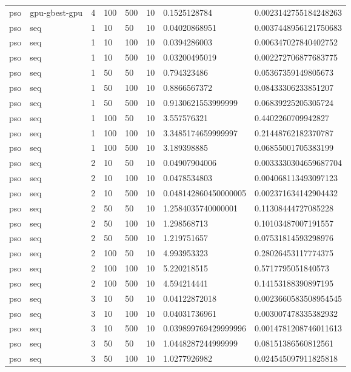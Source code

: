 \begin{table}[t]
\begin{tabular}{llllllll}
pso & gpu-gbest-gpu & 4 & 100 & 500 & 10 & 0.1525128784 & 0.0023142755184248263 \\
pso & seq & 1 & 10 & 50 & 10 & 0.04020868951 & 0.0037448956121750683 \\
pso & seq & 1 & 10 & 100 & 10 & 0.0394286003 & 0.006347027840402752 \\
pso & seq & 1 & 10 & 500 & 10 & 0.03200495019 & 0.002272706877683775 \\
pso & seq & 1 & 50 & 50 & 10 & 0.794323486 & 0.05367359149805673 \\
pso & seq & 1 & 50 & 100 & 10 & 0.8866567372 & 0.08433306233851207 \\
pso & seq & 1 & 50 & 500 & 10 & 0.9130621553999999 & 0.06839225205305724 \\
pso & seq & 1 & 100 & 50 & 10 & 3.557576321 & 0.4402260709942827 \\
pso & seq & 1 & 100 & 100 & 10 & 3.3485174659999997 & 0.21448762182370787 \\
pso & seq & 1 & 100 & 500 & 10 & 3.189398885 & 0.06855001705383199 \\
pso & seq & 2 & 10 & 50 & 10 & 0.04907904006 & 0.0033330304659687704 \\
pso & seq & 2 & 10 & 100 & 10 & 0.0478534803 & 0.004068113493097123 \\
pso & seq & 2 & 10 & 500 & 10 & 0.048142860450000005 & 0.002371634142904432 \\
pso & seq & 2 & 50 & 50 & 10 & 1.2584035740000001 & 0.11308444727085228 \\
pso & seq & 2 & 50 & 100 & 10 & 1.298568713 & 0.10103487007191557 \\
pso & seq & 2 & 50 & 500 & 10 & 1.219751657 & 0.07531814593298976 \\
pso & seq & 2 & 100 & 50 & 10 & 4.993953323 & 0.28026453117774375 \\
pso & seq & 2 & 100 & 100 & 10 & 5.220218515 & 0.5717795051840573 \\
pso & seq & 2 & 100 & 500 & 10 & 4.594214441 & 0.14153188390897195 \\
pso & seq & 3 & 10 & 50 & 10 & 0.04122872018 & 0.0023660583508954545 \\
pso & seq & 3 & 10 & 100 & 10 & 0.04031736961 & 0.003007478335382932 \\
pso & seq & 3 & 10 & 500 & 10 & 0.039899769429999996 & 0.0014781208746011613 \\
pso & seq & 3 & 50 & 50 & 10 & 1.0448287244999999 & 0.08151386560812561 \\
pso & seq & 3 & 50 & 100 & 10 & 1.0277926982 & 0.024545097911825818 \\

\end{tabular}
\end{table}
